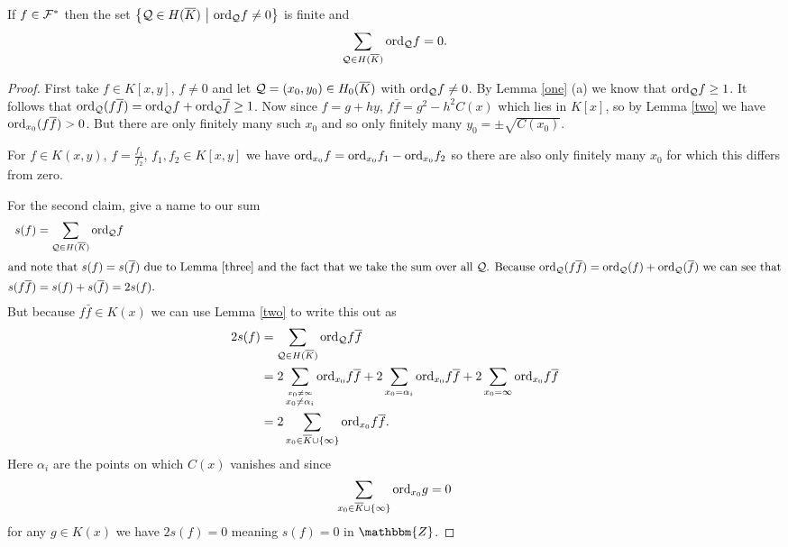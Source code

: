 \documentclass[english,11pt,a4paper]{article}
\begin{document}
\begin{lemma}\label{sform}
  If $f \in \mathcal{F}^*$ then the set $\big \{ \mathcal{Q} \in H(\overline K) \ \big | \ \text{ord}_{\mathcal{Q}} f \neq 0 \big \}$ is finite and 
  \begin{align*}
    \sum_{\q \in \ekb} \ordq f = 0.%
  \end{align*}
  \begin{proof}
    First take $f \in K[x,y]$, $f \neq 0$ and let $\mathcal{Q} = (x_0,y_0) \in H_0(\overline K)$ with $\text{ord}_{\mathcal{Q}} f \neq 0$. By Lemma \ref{one} (a) we know that $\text{ord}_{\mathcal{Q}} f \geq 1$. It follows that $\text{ord}_{\mathcal{Q}} (f \overline f) = \text{ord}_{\mathcal{Q}} f + \text{ord}_{\mathcal{Q}} \overline f \geq 1$. Now since $f = g + h y$, $f \bar f = g^2 - h^2 C(x)$ which lies in $K[x]$, so by Lemma \ref{two} we have $\text{ord}_{x_0} (f \overline f) > 0$. But there are only finitely many such $x_0$ and so only finitely many $y_0 = \pm \sqrt{C(x_0)}$.

    For $f \in K(x,y)$, $f = \frac{f_1}{f_2}$, $f_1, f_2 \in K[x,y]$ we have $\text{ord}_{x_0} f = \text{ord}_{x_0} f_1 - \text{ord}_{x_0} f_2$ so there are also only finitely many $x_0$ for which this differs from zero.

    For the second claim, give a name to our sum
    \begin{align*}
      s(f) &= \sum_{\mathcal{Q} \in H(\overline K)} \text{ord}_{\mathcal{Q}} f \\
      \intertext{and note that $s(f) = s(\overline f)$ due to Lemma \ref{three} and the fact that we take the sum over all $\mathcal{Q}$. Because $\text{ord}_{\mathcal{Q}} (f \overline f ) = \text{ord}_{\mathcal{Q}} (f) + \text{ord}_{\mathcal{Q}} ( \overline f )$ we can see that}
      s(f \overline f) &= s(f) + s(\overline f) = 2 s(f).
    \end{align*}
    But because $f \bar f \in K(x)$ we can use Lemma \ref{two} to write this out as
    \begin{align*}
      2s(f) &= \sum_{\mathcal{Q} \in H(\overline K)} \text{ord}_{\mathcal{Q}} f \overline f\\
      			&=2 \sum_{\stackrel{x_0 \neq \infty}{x_0 \neq \alpha_i}} \text{ord}_{x_0} f \overline f 
      			+ 2 \sum_{x_0 = \alpha_i} \text{ord}_{x_0} f \overline f 
      			+ 2 \sum_{x_0 = \infty} \text{ord}_{x_0} f \overline f\\
      			&=2 \sum_{x_0 \in \overline K \cup \{ \infty \}} \text{ord}_{x_0} f \overline f.
    \end{align*}
    Here $\alpha_i$ are the points on which $C(x)$ vanishes %
    and since
    \begin{align*}
    	\sum_{x_0 \in \overline K \cup \{ \infty \}} \text{ord}_{x_0} g = 0
    \end{align*}
    for any $g \in K(x)$ we have $2s(f)=0$ meaning $s(f) = 0$ in $\mathbbm{Z}$.
  \end{proof}
\end{lemma}
\end{document}
